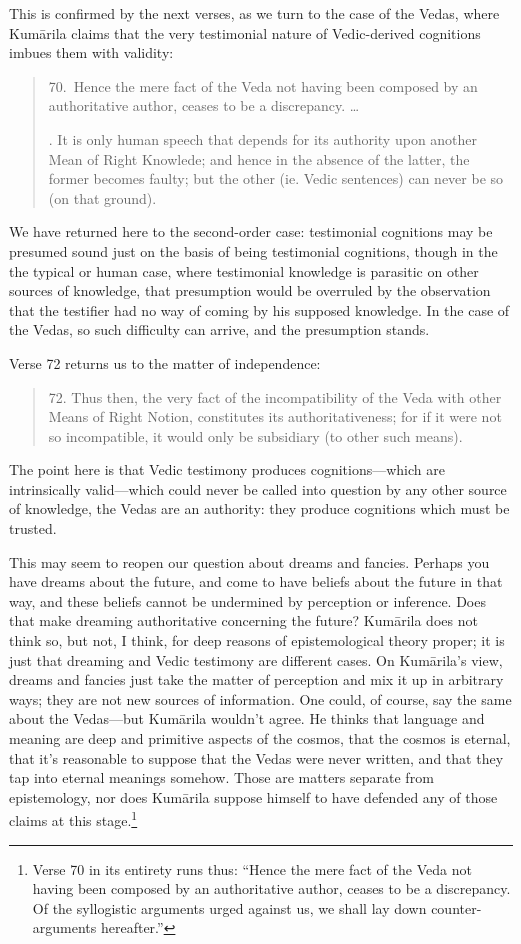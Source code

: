 ﻿\documentclass[11pt]{amsart}
\begin{document}
This is confirmed by the next verses, as we turn to the case of the Vedas, where Kum\=arila claims that the very testimonial nature of Vedic-derived cognitions imbues them with validity:\small\begin{quote}70.~Hence the mere fact of the Veda not having been composed by an authoritative author, ceases to be a discrepancy. \ldots 

. It is only human speech that depends for its authority upon another Mean of Right Knowlede; and hence in the absence of the latter, the former becomes faulty; but the other (ie. Vedic sentences) can never be so (on that ground).\end{quote}\normalsize We have returned here to the second-order case: testimonial cognitions may be presumed sound just on the basis of being testimonial cognitions, though in the the typical or human case, where testimonial knowledge is parasitic on other sources of knowledge, that presumption would be overruled by the observation that the testifier had no way of coming by his supposed knowledge. In the case of the Vedas, so such difficulty can arrive, and the presumption stands.

Verse 72 returns us to the matter of independence:\small\begin{quote}72. Thus then, the very fact of the incompatibility of the Veda with other Means of Right Notion, constitutes its authoritativeness; for if it were not so incompatible, it would only be subsidiary (to other such means).\end{quote}\normalsize The point here is that Vedic testimony produces cognitions---which are intrinsically valid---which could never be called into question by any other source of knowledge, the Vedas are an authority: they produce cognitions which must be trusted. 

This may seem to reopen our question about dreams and fancies. Perhaps you have dreams about the future, and come to have beliefs about the future in that way, and these beliefs cannot be undermined by perception or inference. Does that make dreaming authoritative concerning the future? Kum\=arila does not think so, but not, I think, for deep reasons of epistemological theory proper; it is just that dreaming and Vedic testimony are different cases. On Kum\=arila's view, dreams and fancies just take the matter of perception and mix it up in arbitrary ways; they are not new sources of information. One could, of course, say the same about the Vedas---but Kum\=arila wouldn't agree. He thinks that language and meaning are deep and primitive aspects of the cosmos, that the cosmos is eternal, that it's reasonable to suppose that the Vedas were never written, and that they tap into eternal meanings somehow. Those are matters separate from epistemology, nor does Kum\=arila suppose himself to have defended any of those claims at this stage.\footnote{Verse 70 in its entirety runs thus: ``Hence the mere fact of the Veda not having been composed by an authoritative author, ceases to be a discrepancy. Of the syllogistic arguments urged against us, we shall lay down counter-arguments hereafter.''}
\end{document}
